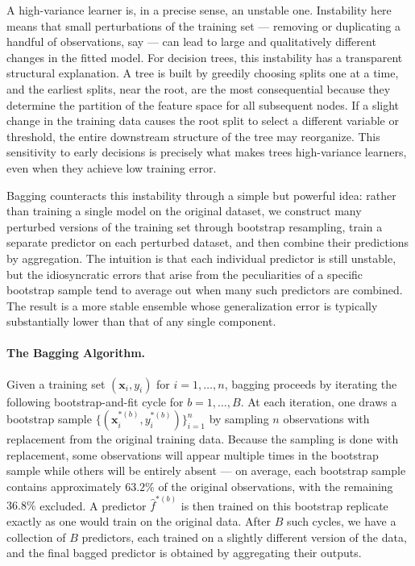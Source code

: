 A high-variance learner is, in a precise sense, an unstable one. Instability here means that small perturbations of the training set --- removing or duplicating a handful of observations, say --- can lead to large and qualitatively different changes in the fitted model. For decision trees, this instability has a transparent structural explanation. A tree is built by greedily choosing splits one at a time, and the earliest splits, near the root, are the most consequential because they determine the partition of the feature space for all subsequent nodes. If a slight change in the training data causes the root split to select a different variable or threshold, the entire downstream structure of the tree may reorganize. This sensitivity to early decisions is precisely what makes trees high-variance learners, even when they achieve low training error.

Bagging counteracts this instability through a simple but powerful idea: rather than training a single model on the original dataset, we construct many perturbed versions of the training set through bootstrap resampling, train a separate predictor on each perturbed dataset, and then combine their predictions by aggregation. The intuition is that each individual predictor is still unstable, but the idiosyncratic errors that arise from the peculiarities of a specific bootstrap sample tend to average out when many such predictors are combined. The result is a more stable ensemble whose generalization error is typically substantially lower than that of any single component.

\paragraph{The Bagging Algorithm.}

Given a training set $(\mathbf{x}_i, y_i)$ for $i = 1, \ldots, n$, bagging proceeds by iterating the following bootstrap-and-fit cycle for $b = 1, \ldots, B$. At each iteration, one draws a bootstrap sample $\{(\mathbf{x}_i^{*(b)}, y_i^{*(b)})\}_{i=1}^n$ by sampling $n$ observations with replacement from the original training data. Because the sampling is done with replacement, some observations will appear multiple times in the bootstrap sample while others will be entirely absent --- on average, each bootstrap sample contains approximately $63.2\%$ of the original observations, with the remaining $36.8\%$ excluded. A predictor $\hat{f}^{*(b)}$ is then trained on this bootstrap replicate exactly as one would train on the original data. After $B$ such cycles, we have a collection of $B$ predictors, each trained on a slightly different version of the data, and the final bagged predictor is obtained by aggregating their outputs.

